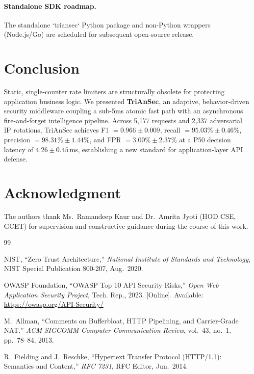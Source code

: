 \documentclass[journal,10pt]{IEEEtran}
\begin{document}
\begin{table}[!t]
\paragraph{Standalone SDK roadmap.} The standalone `triansec` Python package and non-Python wrappers (Node.js/Go) are scheduled for subsequent open-source release.

\section{Conclusion}
\label{sec:conclusion}

Static, single-counter rate limiters are structurally obsolete for protecting application business logic. We presented \textbf{TriAnSec}, an adaptive, behavior-driven security middleware coupling a sub-5ms atomic fast path with an asynchronous fire-and-forget intelligence pipeline. Across 5,177 requests and 2,337 adversarial IP rotations, TriAnSec achieves F1 $=0.966\pm0.009$, recall $=95.03\%\pm0.46\%$, precision $=98.31\%\pm1.44\%$, and FPR $=3.00\%\pm2.37\%$ at a P50 decision latency of $4.26\pm0.45$\,ms, establishing a new standard for application-layer API defense.

\section*{Acknowledgment}
The authors thank Ms.\ Ramandeep Kaur and Dr.\ Amrita Jyoti (HOD CSE, GCET) for supervision and constructive guidance during the course of this work.

\begin{thebibliography}{99}

NIST, ``Zero Trust Architecture,'' \emph{National Institute of Standards and Technology}, NIST Special Publication 800-207, Aug.~2020.

OWASP Foundation, ``OWASP Top 10 API Security Risks,'' \emph{Open Web Application Security Project}, Tech. Rep., 2023. [Online]. Available: \url{https://owasp.org/API-Security/}

M.~Allman, ``Comments on Bufferbloat, HTTP Pipelining, and Carrier-Grade NAT,'' \emph{ACM SIGCOMM Computer Communication Review}, vol.~43, no.~1, pp.~78--84, 2013.

R.~Fielding and J.~Reschke, ``Hypertext Transfer Protocol (HTTP/1.1): Semantics and Content,'' \emph{RFC 7231}, RFC Editor, Jun.~2014.


\end{thebibliography}
\end{table}
\end{document}
